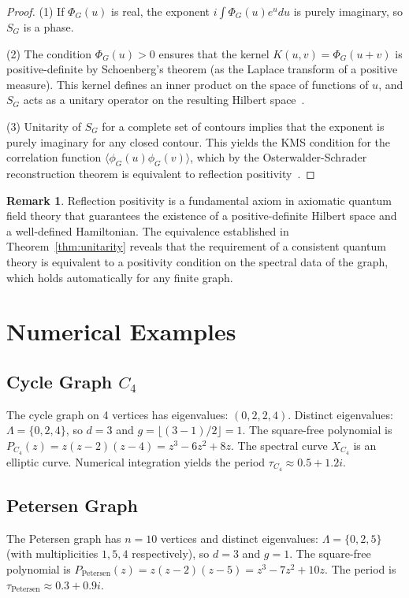 \documentclass[12pt]{article}
\theoremstyle{definition}
\newtheorem{remark}[theorem]{Remark}
\begin{document}
\begin{proof}
(1) If $\Phi_G(u)$ is real, the exponent $i \int \Phi_G(u) e^u du$ is purely imaginary, so $S_G$ is a phase.

(2) The condition $\Phi_G(u) > 0$ ensures that the kernel $K(u,v) = \Phi_G(u + v)$ is positive-definite by Schoenberg's theorem (as the Laplace transform of a positive measure). This kernel defines an inner product on the space of functions of $u$, and $S_G$ acts as a unitary operator on the resulting Hilbert space~\cite{Cotler2021}.

(3) Unitarity of $S_G$ for a complete set of contours implies that the exponent is purely imaginary for any closed contour. This yields the KMS condition for the correlation function $\langle \phi_G(u) \phi_G(v) \rangle$, which by the Osterwalder-Schrader reconstruction theorem is equivalent to reflection positivity~\cite{Streater1989}.
\end{proof}

\begin{remark}
Reflection positivity is a fundamental axiom in axiomatic quantum field theory that guarantees the existence of a positive-definite Hilbert space and a well-defined Hamiltonian. The equivalence established in Theorem~\ref{thm:unitarity} reveals that the requirement of a consistent quantum theory is equivalent to a positivity condition on the spectral data of the graph, which holds automatically for any finite graph.
\end{remark}

\section{Numerical Examples}

\subsection{Cycle Graph $C_4$}
The cycle graph on 4 vertices has eigenvalues: $(0,2,2,4)$. Distinct eigenvalues: $\Lambda = \{0,2,4\}$, so $d = 3$ and $g = \lfloor(3-1)/2\rfloor = 1$. The square-free polynomial is $P_{C_4}(z) = z(z-2)(z-4) = z^3 - 6z^2 + 8z$. The spectral curve $X_{C_4}$ is an elliptic curve. Numerical integration yields the period $\tau_{C_4} \approx 0.5 + 1.2i$.

\subsection{Petersen Graph}
The Petersen graph has $n = 10$ vertices and distinct eigenvalues: $\Lambda = \{0,2,5\}$ (with multiplicities $1,5,4$ respectively), so $d = 3$ and $g = 1$. The square-free polynomial is $P_{\text{Petersen}}(z) = z(z-2)(z-5) = z^3 - 7z^2 + 10z$. The period is $\tau_{\text{Petersen}} \approx 0.3 + 0.9i$.
\end{document}
